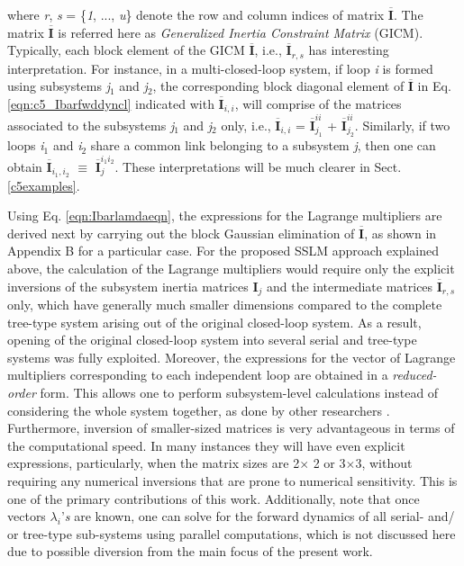 {	where \emph{r}, \emph{s} = \{\emph{1}, ..., \emph{u}\} denote the row and column indices of matrix $\overline{\textbf{I}}$. The matrix $\overline{\textbf{I}}$ is referred here as \emph{Generalized Inertia Constraint Matrix} (GICM). Typically, each block element of the GICM $\overline{\textbf{I}}$, i.e., $\overline{\textbf{I}}_{r,s}$ has interesting interpretation. For instance, in a multi-closed-loop system, if loop \emph{i} is formed using subsystems \emph{j}$_1$ and \emph{j}$_2$, the corresponding block diagonal element of $\overline{\textbf{I}}$ in Eq. \ref{eqn:c5_Ibarfwddyncl} indicated with $\overline{\textbf{I}}_{i,i}$, will comprise of the matrices associated to the subsystems \emph{j}$_1$ and \emph{j}$_2$ only, i.e., $\overline{\textbf{I}}_{i,i}$ = $\overline{\textbf{I}}^{ii}_{j_1}$ + $\overline{\textbf{I}}^{ii}_{j_2}$. Similarly, if two loops \emph{i}$_1$ and \emph{i}$_2$ share a common link belonging to a subsystem \emph{j}, then one can obtain $\overline{\textbf{I}}_{i_1,i_2}$ $\equiv$ $\overline{\textbf{I}}^{i_1i_2}_j$. These interpretations will be much clearer in Sect. \ref{c5examples}.
	
	Using Eq. \ref{eqn:Ibarlamdaeqn}, the expressions  for the Lagrange multipliers are derived next by carrying out the block Gaussian elimination of $\overline{\textbf{I}}$, as shown in Appendix B for a particular case. For the proposed SSLM approach explained above, the calculation of the Lagrange multipliers would require only the explicit inversions of the subsystem inertia matrices \textbf{I}$_j$ and the intermediate matrices $\overline{\textbf{I}}_{r,s}$ only, which have generally much smaller dimensions compared to the complete tree-type system arising out of the original closed-loop system. As a result, opening of the original closed-loop system into several serial and tree-type systems was fully exploited. Moreover, the expressions for the vector of Lagrange multipliers corresponding to each independent loop are obtained in a \textit{reduced-order} form. This allows one to perform subsystem-level calculations instead of considering the whole system together, as done by other researchers \citep{bae1987recursive,blajer1994projective}. Furthermore, inversion of smaller-sized matrices is very advantageous in terms of the computational speed. In many instances they will have even explicit expressions, particularly, when the matrix sizes are 2$\times$ 2 or 3$\times$3, without requiring any numerical inversions that are prone to numerical sensitivity. This is one of the primary contributions of this work. Additionally, note that once vectors \mbox{\boldmath$\lambda$}$_i$'\emph{s} are known, one can solve for the forward dynamics of all serial- and/ or tree-type sub-systems using parallel computations, which is not discussed here due to possible diversion from the main focus of the present work.
	
}
